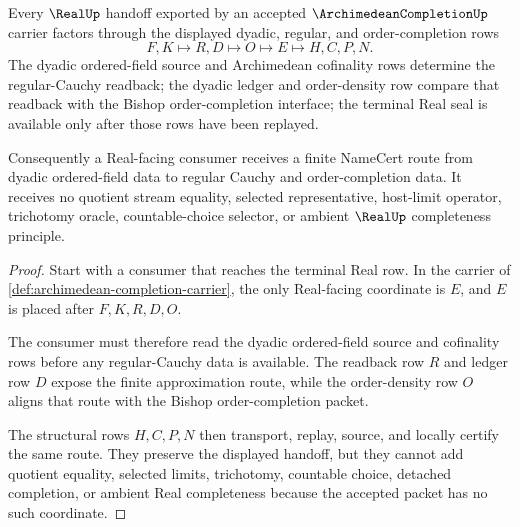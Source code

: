 \begin{theorem}
\label{thm:archimedean-completion-real-handoff}
Every $\RealUp$ handoff exported by an accepted $\ArchimedeanCompletionUp$ carrier factors through the displayed dyadic, regular, and order-completion rows
$$
F,K \longmapsto R,D \longmapsto O \longmapsto E \longmapsto H,C,P,N .
$$
The dyadic ordered-field source and Archimedean cofinality rows determine the regular-Cauchy readback; the dyadic ledger and order-density row compare that readback with the Bishop order-completion interface; the terminal Real seal is available only after those rows have been replayed.

Consequently a Real-facing consumer receives a finite NameCert route from dyadic ordered-field data to regular Cauchy and order-completion data. It receives no quotient stream equality, selected representative, host-limit operator, trichotomy oracle, countable-choice selector, or ambient $\RealUp$ completeness principle.
\end{theorem}
\begin{proof}
Start with a consumer that reaches the terminal Real row. In the carrier of \autoref{def:archimedean-completion-carrier}, the only Real-facing coordinate is $E$, and $E$ is placed after $F,K,R,D,O$.

The consumer must therefore read the dyadic ordered-field source and cofinality rows before any regular-Cauchy data is available. The readback row $R$ and ledger row $D$ expose the finite approximation route, while the order-density row $O$ aligns that route with the Bishop order-completion packet.

The structural rows $H,C,P,N$ then transport, replay, source, and locally certify the same route. They preserve the displayed handoff, but they cannot add quotient equality, selected limits, trichotomy, countable choice, detached completion, or ambient Real completeness because the accepted packet has no such coordinate.
\end{proof}



